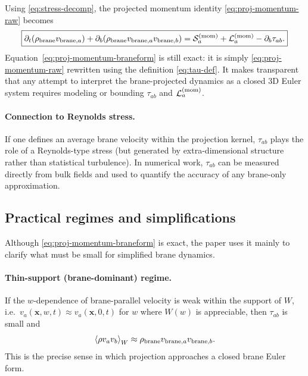 \documentclass[11pt]{article}
\begin{document}
Using \eqref{eq:stress-decomp}, the projected momentum identity \eqref{eq:proj-momentum-raw} becomes
\begin{equation}
\boxed{
\partial_t(\rho_{\rm brane} v_{{\rm brane},a})
+
\partial_b\!\left(\rho_{\rm brane} v_{{\rm brane},a} v_{{\rm brane},b}\right)
=
\mathcal{S}^{({\rm mom})}_a
+
\mathcal{L}^{({\rm mom})}_a
-
\partial_b\tau_{ab}.
}
\label{eq:proj-momentum-braneform}
\end{equation}
Equation~\eqref{eq:proj-momentum-braneform} is still exact: it is simply \eqref{eq:proj-momentum-raw} rewritten using the definition \eqref{eq:tau-def}. It makes transparent that any attempt to interpret the brane-projected dynamics as a closed 3D Euler system requires modeling or bounding $\tau_{ab}$ and $\mathcal{L}^{({\rm mom})}_a$.

\paragraph{Connection to Reynolds stress.}
If one defines an average brane velocity within the projection kernel, $\tau_{ab}$ plays the role of a Reynolds-type stress (but generated by extra-dimensional structure rather than statistical turbulence). In numerical work, $\tau_{ab}$ can be measured directly from bulk fields and used to quantify the accuracy of any brane-only approximation.

\subsection{Practical regimes and simplifications}
\label{app:momentum-regimes}

Although \eqref{eq:proj-momentum-braneform} is exact, the paper uses it mainly to clarify what must be small for simplified brane dynamics.

\paragraph{Thin-support (brane-dominant) regime.}
If the $w$-dependence of brane-parallel velocity is weak within the support of $W$, i.e.\ $v_a(\mathbf{x},w,t)\approx v_a(\mathbf{x},0,t)$ for $w$ where $W(w)$ is appreciable, then $\tau_{ab}$ is small and
\begin{equation}
\left\langle \rho v_a v_b \right\rangle_W \approx \rho_{\rm brane} v_{{\rm brane},a} v_{{\rm brane},b}.
\end{equation}
This is the precise sense in which projection approaches a closed brane Euler form.
\end{document}
